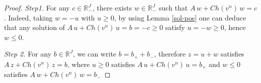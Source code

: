 \documentclass[10pt,a4paper]{amsart}
\begin{document}
  \begin{proof} {\it Step1.} For any $c\in \mathbb{R}^J_-$, there exists $w\in \mathbb{R}^J_-$ such that $A\, w+Ch(v^n)\, w =c$. Indeed, taking $w=-u$ with $u\ge 0$, by using Lemma \ref{sol-pos} one can deduce that any solution of $A\, u+Ch(v^n)\, u =b=-c\ge 0$ satisfy $u=-w\geq0$, hence $w\leq0$.
  
 {\it  Step 2.} For any $b\in \mathbb{R}^J$, we can write $b=b_+ + b_-$, therefore $z=u+w$ satisfies $A\, z+Ch(v^n)\, z =b$, where $u\ge 0$ satisfies $A\, u+Ch(v^n)\, u =b_+$ and  $w\le 0$ satisfies $A\, w+Ch(v^n)\, w =b_-$
  \end{proof} 
\end{document}

